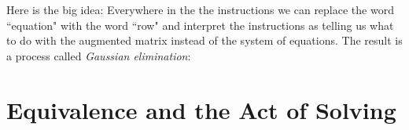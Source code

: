 Here is the big idea: 
Everywhere in the the instructions we can replace the word ``equation" with the word ``row" and interpret the instructions as telling us what to do with the augmented matrix instead of the system of equations.
The result is a process called {\itshape Gaussian elimination}: 
%
%


\section{Equivalence and the Act of Solving}



